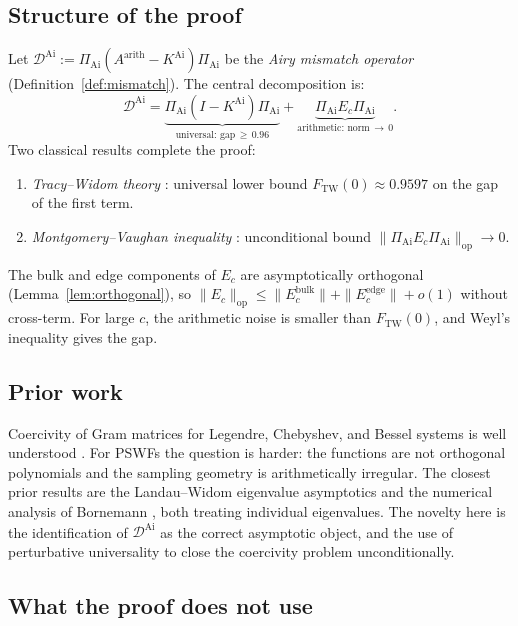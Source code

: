 \documentclass[12pt,a4paper]{amsart}
\theoremstyle{definition}
\newcommand{\KAi}{K^{\mathrm{Ai}}}
\newcommand{\DAi}{\mathcal{D}^{\mathrm{Ai}}}
\newcommand{\PAi}{\Pi_{\mathrm{Ai}}}
\newcommand{\Ec}{E_c}
\newcommand{\norm}[1]{\|#1\|}
\newcommand{\FTW}{F_{\mathrm{TW}}(0)}
\begin{document}
\subsection{Structure of the proof}

Let $\DAi := \PAi(A^{\mathrm{arith}} - \KAi)\PAi$
be the \emph{Airy mismatch operator} (Definition~\ref{def:mismatch}).
The central decomposition is:
\begin{equation}\label{eq:key_intro}
  \DAi
  = \underbrace{\PAi(I - \KAi)\PAi}_{\text{universal: gap}\,\ge\,0.96}
  + \underbrace{\PAi \Ec \PAi}_{\text{arithmetic: norm}\,\to\,0}.
\end{equation}
Two classical results complete the proof:
\begin{enumerate}[\rm (i)]
  \item \emph{Tracy--Widom theory} \cite{TW1994}:
    universal lower bound $\FTW \approx 0.9597$ on the gap of the first term.
  \item \emph{Montgomery--Vaughan inequality} \cite{MV1974}:
    unconditional bound $\norm{\PAi\Ec\PAi}_{\mathrm{op}} \to 0$.
\end{enumerate}
The bulk and edge components of $\Ec$ are asymptotically orthogonal
(Lemma~\ref{lem:orthogonal}), so
$\norm{\Ec}_{\mathrm{op}} \le \norm{\Ec^{\mathrm{bulk}}} + \norm{\Ec^{\mathrm{edge}}} + o(1)$
without cross-term.
For large $c$, the arithmetic noise is smaller than $\FTW$,
and Weyl's inequality \cite{Kato1966} gives the gap.

\subsection{Prior work}

Coercivity of Gram matrices for Legendre, Chebyshev, and Bessel systems
is well understood \cite{Young2001}.
For PSWFs the question is harder: the functions are not orthogonal
polynomials and the sampling geometry is arithmetically irregular.
The closest prior results are the Landau--Widom eigenvalue asymptotics
\cite{Widom1964,LandauWidom1980} and the numerical analysis of Bornemann
\cite{Bornemann2010}, both treating individual eigenvalues.
The novelty here is the identification of $\DAi$ as the correct
asymptotic object, and the use of perturbative universality to close the
coercivity problem unconditionally.

\subsection{What the proof does not use}
\end{document}
